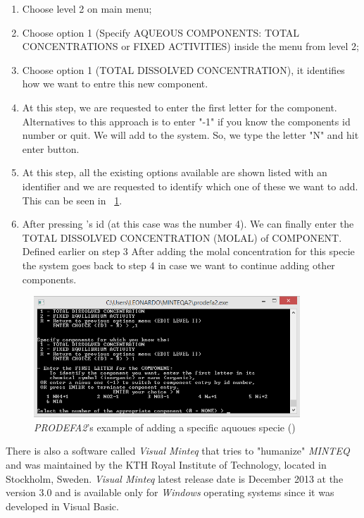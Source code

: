 \documentclass[ppgc,mestrado,English]{iiufrgs}
\begin{document}
\begin{enumerate}
\item Choose level 2 on main menu;
\item Choose option 1 (Specify AQUEOUS COMPONENTS: TOTAL CONCENTRATIONS or FIXED ACTIVITIES) inside the menu from level 2;
\item Choose option 1 (TOTAL DISSOLVED CONCENTRATION), it identifies how we want to entre this new component.
\item At this step, we are requested to enter the first letter for the component. Alternatives to this approach is to enter "-1" if you know the components id number or quit. We will add  to the system. So, we type the letter "N" and hit enter button.
\item At this step, all the existing options available are shown listed with an identifier and we are requested to identify which one of these we want to add. This can be seen in ~\ref{minteq:Na+}.
\item After pressing 's id (at this case was the number 4). We can finally enter the TOTAL DISSOLVED CONCENTRATION (MOLAL) of COMPONENT. Defined earlier on step 3 After adding the molal concentration for this specie the system goes back to step 4 in case we want to continue adding other components.
\end{enumerate}

\begin{figure}[ht!]
\centering
\includegraphics[width=100mm]{minteq-Na+.png}
\caption{\emph{PRODEFA2}'s example of adding a specific aquoues specie () }
\label{minteq:Na+}
\end{figure}

There is also a software called \emph{Visual Minteq} that tries to "humanize" \emph{MINTEQ} and was maintained by the KTH Royal Institute of Technology, located in Stockholm, Sweden. \emph{Visual Minteq} latest release date is December 2013 at the version 3.0 and is available only for \emph{Windows} operating systems since it was developed in Visual Basic. 
\end{document}
